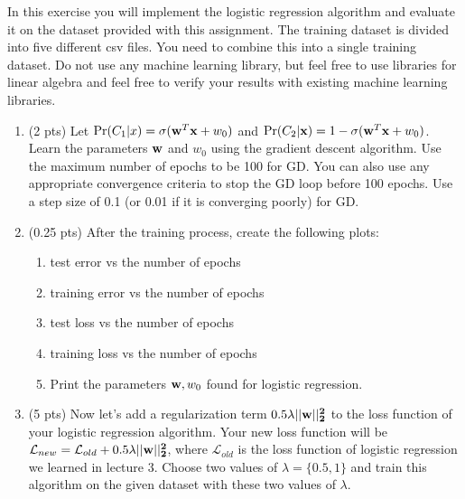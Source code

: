 \documentclass[10pt,letter,notitlepage]{article}
\newcounter{exercise}
\begin{document}



\begin{exercise}

\noindent In this exercise you will implement the logistic regression algorithm and evaluate it on the dataset provided with this assignment. The training dataset is divided into five different csv files. You need to combine this into a single training dataset. Do not use any machine learning library, but feel free to use libraries for linear algebra and feel free to verify your results with existing machine learning libraries.

\begin{enumerate}
    \item (2 pts) Let $\Pr(C_1|x) = \sigma({\bf{w}}^T{\bf{x}}+w_0)$ and $\Pr(C_2|{\bf{x}}) = 1 - \sigma({\bf{w}}^T{\bf{x}}+w_0)$. Learn the parameters ${\bf{w}}$ and $w_0$ using the gradient descent algorithm. Use the maximum number of epochs to be 100 for GD. You can also use any appropriate convergence criteria to stop the GD loop before 100 epochs. Use a step size of 0.1 (or 0.01 if it is converging poorly) for GD. 
    
    \item (0.25 pts) After the training process, create the following plots:
		\begin{enumerate}
			\item test error vs the number of epochs
			\item training error vs the number of epochs
			\item test loss vs the number of epochs
			\item training loss vs the number of epochs
            \item Print the parameters ${\bf w}, w_0$ found for logistic regression.
		\end{enumerate}
    \item (5 pts) Now let's add a regularization term $0.5\lambda ||\bf{w}||_2^2$ to the loss function of your logistic regression algorithm. Your new loss function will be $\mathcal{L}_{new} = \mathcal{L}_{old} + 0.5\lambda ||\bf{w}||_2^2$, where $\mathcal{L}_{old}$ is the loss function of logistic regression we learned in lecture 3. Choose two values of $\lambda = \{0.5, 1\}$ and train this algorithm on the given dataset with these two values of $\lambda$. 
    

\end{enumerate}
\end{exercise}
\end{document}
